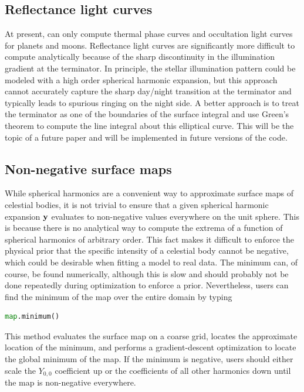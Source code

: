 \documentclass[modern]{aastex61}
\begin{document}
\subsection{Reflectance light curves}
At present, \starry can only compute thermal phase curves and occultation
light curves for planets and moons. Reflectance light curves are significantly
more difficult to compute analytically because of the sharp discontinuity in the
illumination gradient at the terminator. In principle, the stellar illumination
pattern could be modeled with a high order spherical harmonic expansion, but
this approach cannot accurately capture the sharp day/night transition at the
terminator and typically leads to spurious ringing on the night side. A
better approach is to treat the terminator as one of the boundaries of the
surface integral and use Green's theorem to compute the line integral about
this elliptical curve. This will be the topic of a future paper and will
be implemented in future versions of the code.

\subsection{Non-negative surface maps}
\label{sec:nonnegative}
While spherical harmonics are a convenient way to approximate surface
maps of celestial bodies, it is not trivial to ensure
that a given spherical harmonic expansion ${\mathbf{y}}$ evaluates to
non-negative values everywhere on the unit sphere. This is because
there is no analytical way to compute the extrema of a function of
spherical harmonics of arbitrary order.
This fact makes it difficult to enforce the physical prior that the
specific intensity of a celestial body cannot be negative, which
could be desirable when fitting a model to real data. The minimum
can, of course, be found numerically, although this is slow and
should probably not be done repeatedly during optimization to
enforce a prior. Nevertheless, users can find the minimum of the
map over the entire domain by typing
%
\begin{lstlisting}[language=Python,firstnumber=last]
map.minimum()
\end{lstlisting}
%
This method evaluates the surface map on a coarse grid, locates the
approximate location of the minimum, and performs a gradient-descent
optimization to locate the global minimum of the map. If the minimum
is negative, users should either scale the $Y_{0,0}$ coefficient up
or the coefficients of all other harmonics down until the map is
non-negative everywhere.
\end{document}
